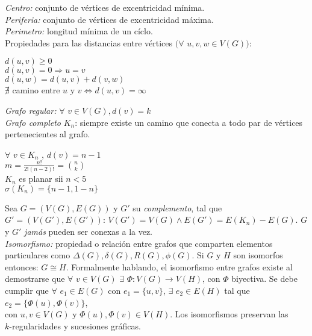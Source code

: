 \documentclass[titlepage,a4paper,12pt,twoside]{article}
\begin{document}
\textit{Centro:} conjunto de vértices de excentricidad mínima.\\

\textit{Periferia:} conjunto de vértices de excentricidad máxima.\\

\textit{Perimetro:} longitud mínima de un cíclo.\\

Propiedades para las distancias entre vértices $(\forall $ $u,v,w \in V(G))$:

\begin{center}
$d(u,v) \geqslant 0$\\
$ $\\
$d(u,v) = 0 \Rightarrow u = v$\\
$ $\\
$d(u,w) = d(u,v) + d(v,w)$\\
$ $\\
$\nexists$ camino entre $u$ y $v \Leftrightarrow d(u,v) = \infty$ \\
\end{center}

\textit{Grafo regular:} $\forall $ $ v \in V(G), d(v) = k$\\

\textit{Grafo completo} $K_{n}$: siempre existe un camino que conecta a todo par de vértices pertenecientes al grafo.

\begin{center}
$\forall $ $v \in K_{n} $ , $ d(v) = n - 1$\\
$ $\\
$\displaystyle m = \frac{n!}{2!(n-2)!} = \binom{n}{k}$\\
$ $\\
$K_{n}$ es planar sii $n < 5$\\
$ $\\
$\sigma (K_{n}) = \{n-1,1-n\}$\\
\end{center}

Sea $G = (V(G),E(G))$ y $G'$ su \textit{complemento}, tal que $G' = (V(G'),E(G'))$: $V(G') = V(G) \wedge E(G') = E(K_{n}) - E(G)$. $G$ y $G'$ \textit{jamás} pueden ser conexas a la vez.\\

\textit{Isomorfismo:} propiedad o relación entre grafos que comparten elementos particulares como $ \Delta (G),\delta (G),R(G), \phi (G)$. Si $G$ y $H$ son isomorfos entonces: $G \cong H$. Formalmente hablando, el isomorfismo entre grafos existe al demostrarse que $\forall $ $v \in V(G) $ $\exists $ $ \Phi:V(G) \rightarrow V(H)$, con $\Phi$ biyectiva. Se debe cumplir que $\forall $ $e_{1} \in E(G) $ con $e_{1} = \{u,v\}$, $\exists $ $ e_{2} \in E(H)$ tal que $e_{2} = \{ \Phi (u), \Phi (v)\}$,\\ con $u,v \in V(G)$ y $\Phi (u), \Phi (v) \in V(H)$. Los isomorfismos preservan las\\ $k$-regularidades y sucesiones gráficas.\\
\end{document}
